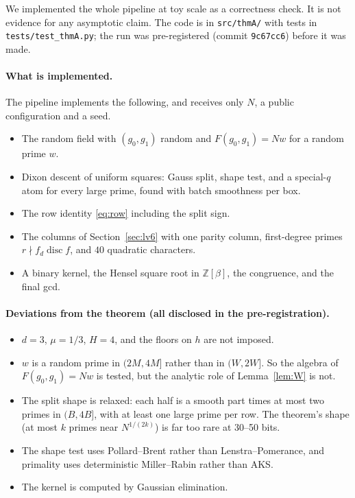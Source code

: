 \documentclass[11pt]{amsart}
\theoremstyle{definition}
\newcommand{\Z}{\mathbb{Z}}
\newcommand{\disc}{\operatorname{disc}}
\begin{document}
We implemented the whole pipeline at toy scale as a correctness check. It is not evidence for any asymptotic claim. The code
is in \texttt{src/thmA/} with tests in \texttt{tests/test\_thmA.py}; the run was pre-registered (commit \texttt{9c67cc6}) before it was made.

\paragraph{What is implemented.} The pipeline implements the following, and receives only $N$, a public configuration and a seed.
\begin{itemize}
\item The random field with $(g_0,g_1)$ random and $F(g_0,g_1)=Nw$ for a random prime $w$.
\item Dixon descent of uniform squares: Gauss split, shape test, and a special-$q$ atom for every large prime, found with batch smoothness per box.
\item The row identity \eqref{eq:row} including the split sign.
\item The columns of Section~\ref{sec:lv6} with one parity column, first-degree primes $r\nmid f_d\disc f$, and $40$ quadratic characters.
\item A binary kernel, the Hensel square root in $\Z[\beta]$, the congruence, and the final gcd.
\end{itemize}

\paragraph{Deviations from the theorem (all disclosed in the pre-registration).}
\begin{itemize}
\item $d=3$, $\mu=1/3$, $H=4$, and the floors on $h$ are not imposed.
\item $w$ is a random prime in $(2M,4M]$ rather than in $(W,2W]$. So the algebra of $F(g_0,g_1)=Nw$ is tested, but the analytic role of Lemma~\ref{lem:W} is not.
\item The split shape is relaxed: each half is a smooth part times at most two primes in $(B,4B]$, with at least one large prime per row. The
  theorem's shape (at most $k$ primes near $N^{1/(2k)}$) is far too rare at 30--50 bits.
\item The shape test uses Pollard--Brent rather than Lenstra--Pomerance, and primality uses deterministic Miller--Rabin rather than AKS.
\item The kernel is computed by Gaussian elimination.
\end{itemize}
\end{document}
